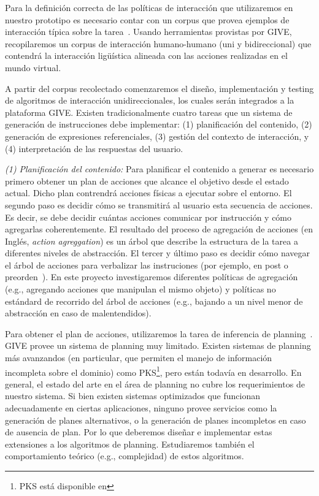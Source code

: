 Para la definici\'on correcta de las pol\'iticas de interacci\'on que
utilizaremos en nuestro prototipo es necesario
contar con un corpus que provea ejemplos de interacci\'on t\'ipica sobre la
tarea~\citep{HCRC-93, byron-06}.  Usando herramientas provistas por GIVE,
recopilaremos un corpus de interacci\'on humano-humano (uni y bidireccional)
que contendr\'a la interacci\'on lig\"u\'istica alineada con las acciones
realizadas en el mundo virtual.

A partir del corpus recolectado comenzaremos el dise\~no,
implementaci\'on y testing de algoritmos de interacci\'on unidireccionales, los 
cuales ser\'an integrados a la plataforma GIVE.
Existen tradicionalmente cuatro tareas que un sistema de generaci\'on
de instrucciones debe implementar: (1) planificaci\'on del contenido, (2) generaci\'on
de expresiones referenciales, (3) gesti\'on del contexto de interacci\'on, y
(4) interpretaci\'on de las respuestas del usuario.

\emph{(1) Planificaci\'on del contenido:} Para planificar el contenido a generar es necesario primero obtener un plan de
acciones que alcance el objetivo desde el estado actual. Dicho plan contrendr\'a
acciones f\'isicas a ejecutar sobre el entorno. El segundo paso es decidir
c\'omo se transmitir\'a al usuario esta secuencia de acciones. Es decir,
se debe decidir cu\'antas acciones comunicar
por instrucci\'on y c\'omo agregarlas coherentemente. El
resultado del proceso de agregaci\'on de acciones (en Ingl\'es, \emph{action agreggation}) 
es un \'arbol que describe la
estructura de la tarea a diferentes niveles de abstracci\'on. El tercer y \'ultimo paso
es decidir c\'omo navegar el \'arbol de acciones para verbalizar las
instruciones (por ejemplo, en post o preorden~\citep{foster-etal-ijcai2009}). En este proyecto investigaremos
diferentes pol\'iticas de agregaci\'on (e.g., agregando acciones que manipulan el mismo
objeto) y pol\'iticas no est\'andard de recorrido del \'arbol de acciones (e.g., bajando a un
nivel menor de abstracci\'on en caso de malentendidos).

Para obtener el plan de acciones, utilizaremos la tarea de inferencia de
planning~\citep{nau04}. GIVE provee un sistema de planning muy
limitado.  Existen sistemas de planning m\'as avanzandos (en particular,
que permiten el manejo de informaci\'on incompleta sobre el dominio)
como PKS\footnote{PKS est\'a disponible en }, pero
est\'an todav\'ia en desarrollo.  En general, el estado del
arte en el \'area de planning no cubre los requerimientos de nuestro
sistema.  Si bien existen sistemas optimizados que funcionan adecuadamente
en ciertas aplicaciones, ninguno provee servicios como la generaci\'on de
planes alternativos, o la generaci\'on de planes incompletos en caso de
ausencia de plan. Por lo que deberemos dise\~nar e implementar estas
extensiones a los algoritmos de planning. Estudiaremos tambi\'en el
comportamiento te\'orico (e.g., complejidad) de estos algoritmos.

